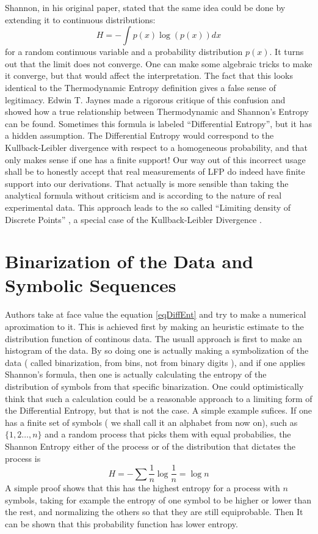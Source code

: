 \documentclass{article}
\begin{document}
Shannon, in his original paper, stated that the same idea could be done by extending it to continuous distributions:
\begin{equation}
H=-\int p(x) \log (p(x)) d x
\end{equation}
for a random continuous variable and a probability distribution $p(x)$. It turns out that the limit does not converge. One can make some algebraic tricks to make it converge, but that would affect the interpretation. The fact that this looks identical to the Thermodynamic Entropy definition gives a false sense of legitimacy. Edwin T. Jaynes \cite{Jaynes1957}  made a rigorous critique of this confusion and showed how a true relationship between Thermodynamic and Shannon's Entropy can be found. Sometimes this formula is
labeled ``Differential Entropy'', but it has a hidden assumption.
The Differential Entropy would correspond to the Kullback-Leibler divergence
with respect to a homogeneous probability, and that only makes sense if one
has a finite support!
Our way out of this incorrect usage shall be to honestly accept that real measurements
of LFP do indeed have finite support into our derivations. That actually is more sensible than taking the analytical formula without criticism and is according to the nature of real experimental data. This approach leads to the so called ``Limiting density
of Discrete Points'' \cite{Jaynes1968, Jaynes2003}, a special case of the
Kullback-Leibler Divergence \cite{Kullback1959}.


\section{Binarization of the Data and Symbolic Sequences}

Authors take at face value the equation \ref{eqDiffEnt} and try to make a numerical aproximation to it. This is achieved first by making an heuristic estimate to the distribution function of continous data. The usuall approach is first to make an histogram of the data. By so doing one is actually making a symbolization of the data ( called binarization, from bins, not from binary digits ), and if one applies Shannon's formula, then one is actually calculating the entropy of the distribution of symbols from that specific binarization. One could optimistically think that such a calculation could be a reasonable approach to a limiting form of the Differential Entropy, but that is not the case. A simple example sufices.
If one has a finite set of symbols ( we shall call it an alphabet from now on), such as $\{1,2\ldots,n\}$ and a random process that picks them with equal probabilies, the Shannon Entropy either of the process or of the distribution that dictates the process is 
$$
H=-\sum \frac{1}{n} \log \frac{1}{n} = \log n
$$
A simple proof shows that this has the highest entropy for a process with $n$ symbols, taking for example the entropy of one symbol to be higher or lower than the rest, and normalizing the others so that they are still equiprobable. Then It can be shown that this probability function has lower entropy. 
\end{document}
